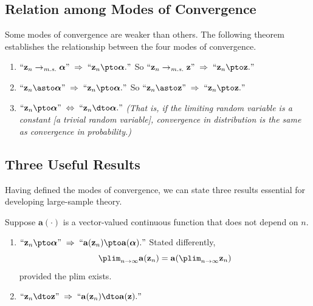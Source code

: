 \subsection*{Relation among Modes of Convergence}

Some modes of convergence are weaker than others.  The following theorem
establishes the relationship between the four modes of convergence.

\begin{lemma}
\label{lem:2.2}
\begin{enumerate}[label=(\alph*)]
  \item $\text{``}\mathbf{z}_n \to_{\emph{m.s.}} \bm{\alpha}\text{''} \;\Rightarrow\;
        \text{``}\mathbf{z}_n \pto \bm{\alpha}.\text{''}$
        So $\text{``}\mathbf{z}_n \to_{\emph{m.s.}} \mathbf{z}\text{''} \;\Rightarrow\;
        \text{``}\mathbf{z}_n \pto \mathbf{z}.\text{''}$
  \item $\text{``}\mathbf{z}_n \asto \bm{\alpha}\text{''} \;\Rightarrow\;
        \text{``}\mathbf{z}_n \pto \bm{\alpha}.\text{''}$
        So $\text{``}\mathbf{z}_n \asto \mathbf{z}\text{''} \;\Rightarrow\;
        \text{``}\mathbf{z}_n \pto \mathbf{z}.\text{''}$
  \item $\text{``}\mathbf{z}_n \pto \bm{\alpha}\text{''} \;\Leftrightarrow\;
        \text{``}\mathbf{z}_n \dto \bm{\alpha}.\text{''}$
        \emph{(That is, if the limiting random variable is a constant
        [a trivial random variable], convergence in distribution is the same
        as convergence in probability.)}
\end{enumerate}
\end{lemma}

\subsection*{Three Useful Results}

Having defined the modes of convergence, we can state three results essential for
developing large-sample theory.

\begin{lemma}
\label{lem:2.3}
Suppose $\mathbf{a}(\cdot)$ is a vector-valued continuous function that does not
depend on $n$.
\begin{enumerate}[label=(\alph*)]
  \item $\text{``}\mathbf{z}_n \pto \bm{\alpha}\text{''} \;\Rightarrow\;
        \text{``}\mathbf{a}(\mathbf{z}_n) \pto \mathbf{a}(\bm{\alpha}).\text{''}$
        Stated differently,
        \[
          \plim_{n \to \infty} \mathbf{a}(\mathbf{z}_n)
          = \mathbf{a}\!\left(\plim_{n \to \infty} \mathbf{z}_n\right)
        \]
        provided the plim exists.
  \item $\text{``}\mathbf{z}_n \dto \mathbf{z}\text{''} \;\Rightarrow\;
        \text{``}\mathbf{a}(\mathbf{z}_n) \dto \mathbf{a}(\mathbf{z}).\text{''}$
\end{enumerate}
\end{lemma}

